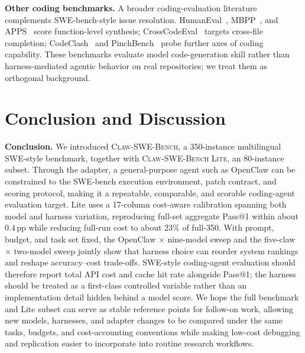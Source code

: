 \documentclass{llmxive}
\begin{document}
\textbf{Other coding benchmarks.}
A broader coding-evaluation literature complements SWE-bench-style issue resolution. HumanEval~\cite{humaneval}, MBPP~\cite{mbpp}, and APPS~\cite{apps} score function-level synthesis; CrossCodeEval~\cite{crosscodeeval} targets cross-file completion; CodeClash~\cite{codeclash} and PinchBench~\cite{pinchbench} probe further axes of coding capability. These benchmarks evaluate model code-generation skill rather than harness-mediated agentic behavior on real repositories; we treat them as orthogonal background.

\section{Conclusion and Discussion}\label{sec:discussion}
\textbf{Conclusion.}
We introduced \textsc{Claw-SWE-Bench}, a 350-instance multilingual SWE-style benchmark, together with \textsc{Claw-SWE-Bench Lite}, an 80-instance subset. Through the adapter, a general-purpose agent such as OpenClaw can be constrained to the SWE-bench execution environment, patch contract, and scoring protocol, making it a repeatable, comparable, and scorable coding-agent evaluation target. Lite uses a 17-column cost-aware calibration spanning both model and harness variation, reproducing full-set aggregate Pass@1 within about $0.4$\,pp while reducing full-run cost to about $23\%$ of full-350. With prompt, budget, and task set fixed, the OpenClaw $\times$ nine-model sweep and the five-claw $\times$ two-model sweep jointly show that harness choice can reorder system rankings and reshape accuracy--cost trade-offs. SWE-style coding-agent evaluation should therefore report total API cost and cache hit rate alongside Pass@1; the harness should be treated as a first-class controlled variable rather than an implementation detail hidden behind a model score. We hope the full benchmark and Lite subset can serve as stable reference points for follow-on work, allowing new models, harnesses, and adapter changes to be compared under the same tasks, budgets, and cost-accounting conventions while making low-cost debugging and replication easier to incorporate into routine research workflows.
\end{document}

